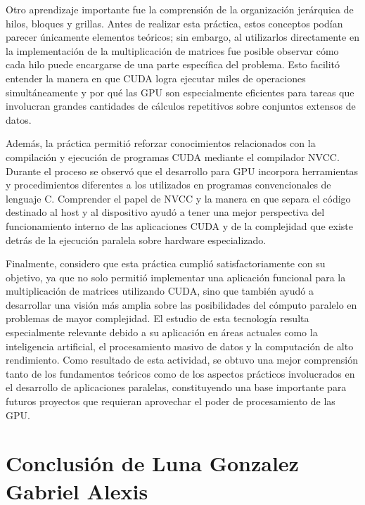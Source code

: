 Otro aprendizaje importante fue la comprensión de la organización jerárquica de hilos, bloques y grillas. Antes de realizar esta práctica, estos conceptos podían parecer únicamente elementos teóricos; sin embargo, al utilizarlos directamente en la implementación de la multiplicación de matrices fue posible observar cómo cada hilo puede encargarse de una parte específica del problema. Esto facilitó entender la manera en que CUDA logra ejecutar miles de operaciones simultáneamente y por qué las GPU son especialmente eficientes para tareas que involucran grandes cantidades de cálculos repetitivos sobre conjuntos extensos de datos.

Además, la práctica permitió reforzar conocimientos relacionados con la compilación y ejecución de programas CUDA mediante el compilador NVCC. Durante el proceso se observó que el desarrollo para GPU incorpora herramientas y procedimientos diferentes a los utilizados en programas convencionales de lenguaje C. Comprender el papel de NVCC y la manera en que separa el código destinado al host y al dispositivo ayudó a tener una mejor perspectiva del funcionamiento interno de las aplicaciones CUDA y de la complejidad que existe detrás de la ejecución paralela sobre hardware especializado.

Finalmente, considero que esta práctica cumplió satisfactoriamente con su objetivo, ya que no solo permitió implementar una aplicación funcional para la multiplicación de matrices utilizando CUDA, sino que también ayudó a desarrollar una visión más amplia sobre las posibilidades del cómputo paralelo en problemas de mayor complejidad. El estudio de esta tecnología resulta especialmente relevante debido a su aplicación en áreas actuales como la inteligencia artificial, el procesamiento masivo de datos y la computación de alto rendimiento. Como resultado de esta actividad, se obtuvo una mejor comprensión tanto de los fundamentos teóricos como de los aspectos prácticos involucrados en el desarrollo de aplicaciones paralelas, constituyendo una base importante para futuros proyectos que requieran aprovechar el poder de procesamiento de las GPU.

\newpage
\section{Conclusión de Luna Gonzalez Gabriel Alexis}


